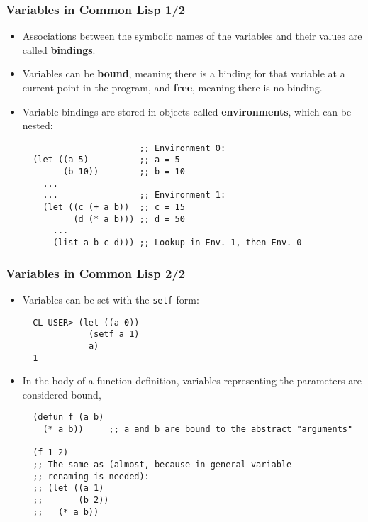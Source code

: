 \documentclass{beamer}
\begin{document}
\begin{frame}[fragile]
  \frametitle{Variables in Common Lisp 1/2}
  \begin{itemize}
  \item Associations between the symbolic names of the variables and their
    values are called \textbf{bindings}.
  \item Variables can be \textbf{bound}, meaning there is a binding for that
    variable at a current point in the program, and \textbf{free}, meaning there
    is no binding.
  \item Variable bindings are stored in objects called \textbf{environments},
    which can be nested:
\begin{verbatim}
                       ;; Environment 0:
  (let ((a 5)          ;; a = 5
        (b 10))        ;; b = 10
    ...
    ...                ;; Environment 1:
    (let ((c (+ a b))  ;; c = 15
          (d (* a b))) ;; d = 50
      ...
      (list a b c d))) ;; Lookup in Env. 1, then Env. 0
\end{verbatim}
  \end{itemize}
\end{frame}

\begin{frame}[fragile]
  \frametitle{Variables in Common Lisp 2/2}
  \begin{itemize}
  \item Variables can be set with the \texttt{setf} form:
\begin{verbatim}
  CL-USER> (let ((a 0))
             (setf a 1)
             a)
  1
\end{verbatim}
  \item In the body of a function definition, variables representing the
    parameters are considered bound,
\begin{verbatim}
  (defun f (a b) 
    (* a b))     ;; a and b are bound to the abstract "arguments"

  (f 1 2)
  ;; The same as (almost, because in general variable
  ;; renaming is needed):
  ;; (let ((a 1)
  ;;       (b 2))
  ;;   (* a b))
\end{verbatim}
  \end{itemize}
\end{frame}
\end{document}
